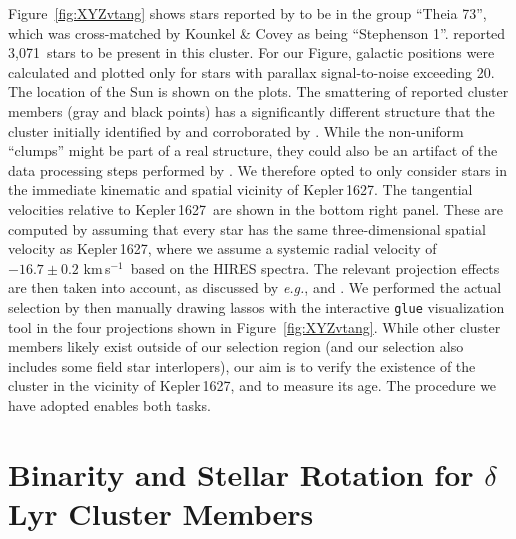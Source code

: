 \documentclass[12pt,modern,twocolumn,tighten]{aastex63}
\newcommand{\sn}{Kepler\,1627} %
\newcommand{\noriginal}{3{,}071} %
\newcommand{\kms}{\,km\,s$^{-1}$}
\begin{document}
Figure~\ref{fig:XYZvtang} shows stars reported by
\citet{kounkel_untangling_2019} to be in the group ``Theia 73'', which
was cross-matched by Kounkel \& Covey as being ``Stephenson 1''.
\citet{kounkel_untangling_2019} reported \noriginal\ stars to be
present in this cluster.  For our Figure, galactic positions were
calculated and plotted only for stars with parallax signal-to-noise
exceeding 20.  The location of the Sun is shown on the plots.  The
smattering of reported cluster members (gray and black points) has a
significantly different structure that the cluster initially
identified by \citet{stephenson_possible_1959} and corroborated by
\citet{eggen_photometric_1968}.  While the non-uniform ``clumps''
might be part of a real structure, they could also be an artifact of
the data processing steps performed by
\citet{kounkel_untangling_2019}.  We therefore opted to only consider
stars in the immediate kinematic and spatial vicinity of \sn.  The
tangential velocities relative to \sn\ are shown in the bottom right
panel.  These are computed by assuming that every star has the same
three-dimensional spatial velocity as \sn, where we assume a systemic
radial velocity of $-16.7 \pm 0.2$\,\kms\ based on the HIRES
spectra.  The
relevant projection effects are then taken into account, as discussed
by {\it e.g.}, \citet{Meingast2021} and \citet{bouma_2021_ngc2516}.
We performed the actual selection by then manually drawing lassos with
the interactive \texttt{glue} visualization tool
\citep{beaumont_2014_13866} in the four projections shown in
Figure~\ref{fig:XYZvtang}.  While other cluster members likely exist
outside of our selection region (and our selection also includes some
field star interlopers), our aim is to verify the existence of the
cluster in the vicinity of Kepler\,1627, and to measure its age.  The
procedure we have adopted enables both tasks.


\section{Binarity and Stellar Rotation for $\delta$\,Lyr Cluster Members}
\label{app:rotationbinarity}
\end{document}
